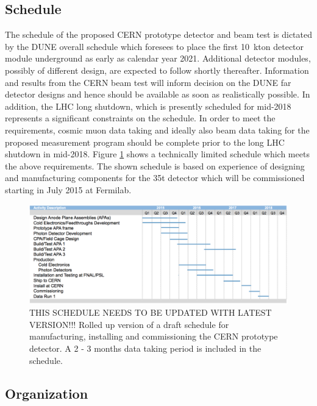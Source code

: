 \label{organ}

\subsection{Schedule}
The schedule of the proposed CERN prototype detector and beam test is dictated by the DUNE overall schedule which foresees to place the first 10~kton detector module 
underground as early as calendar year 2021. Additional detector modules, possibly of different design, are expected to follow shortly thereafter.
Information and results from the CERN beam test will inform decision on the DUNE far detector designs and hence should be available 
as soon as realistically possible. In addition, the LHC long shutdown, which is presently scheduled for mid-2018 represents a significant
constraints on the schedule.
In order to meet the requirements, cosmic muon data taking and ideally also beam data taking for the proposed measurement program 
should be complete prior to  the long LHC shutdown in mid-2018. 
Figure \ref{fig:schedule} shows a technically limited schedule which meets the above requirements.
The shown schedule is based on experience of designing and manufacturing components for the 35t detector which will be commissioned starting in July 2015 at  Fermilab.
\begin{figure}[h]
  \centering
\includegraphics[scale=0.34]{figures/150219_schedule_3APAmod.png}
  \caption{THIS SCHEDULE NEEDS TO BE UPDATED WITH LATEST VERSION!!! Rolled up version of a draft schedule for manufacturing, installing and commissioning the CERN prototype detector. A 2 - 3 months data taking period is included in the schedule. }
  \label{fig:schedule}
\end{figure}


\subsection{Organization}

